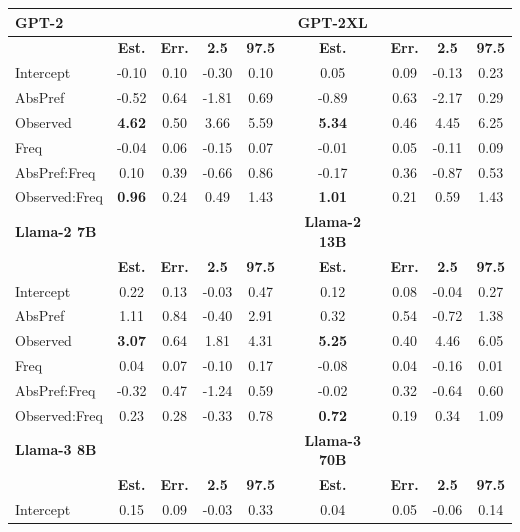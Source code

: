 \documentclass[
  12pt,
  letterpaper,
]{scrreport}
\begin{document}
\begin{table}
{    \centering
    \begin{tabular}{l|cccc|cccc}
    \hline 
        \textbf{GPT-2} & & & & & \textbf{GPT-2XL} \\
        \hline
         & \textbf{Est.} & \textbf{Err.} & \textbf{2.5} & \textbf{97.5} & \textbf{Est.} & \textbf{Err.} & \textbf{2.5} & \textbf{97.5} \\
         \hline
         Intercept & -0.10 & 0.10 & -0.30 & 0.10 & 0.05 & 0.09 & -0.13 & 0.23\\
         AbsPref & -0.52 & 0.64 & -1.81 & 0.69 & -0.89 & 0.63 & -2.17 & 0.29 \\
         Observed & \textbf{4.62} & 0.50 & 3.66 & 5.59 & \textbf{5.34} & 0.46 & 4.45 & 6.25 \\
         Freq & -0.04 & 0.06 & -0.15 & 0.07 & -0.01 & 0.05 & -0.11 & 0.09 \\
         AbsPref:Freq & 0.10 & 0.39 & -0.66 & 0.86 & -0.17 & 0.36 & -0.87 & 0.53 \\
         Observed:Freq & \textbf{0.96} & 0.24 & 0.49 & 1.43 & \textbf{1.01} & 0.21 & 0.59 & 1.43 \\
         \hline
         \textbf{Llama-2 7B} & & & & & \textbf{Llama-2 13B} \\
        \hline
         & \textbf{Est.} & \textbf{Err.} & \textbf{2.5} & \textbf{97.5} & \textbf{Est.} & \textbf{Err.} & \textbf{2.5} & \textbf{97.5} \\
         \hline
         Intercept & 0.22 & 0.13 & -0.03 & 0.47 & 0.12 & 0.08 & -0.04 & 0.27 \\
         AbsPref & 1.11 & 0.84 & -0.40 & 2.91 &  0.32 & 0.54 & -0.72 & 1.38  \\
         Observed & \textbf{3.07} & 0.64 & 1.81 & 4.31 & \textbf{5.25} & 0.40 & 4.46 & 6.05\\
         Freq & 0.04 & 0.07 & -0.10 & 0.17 & -0.08 & 0.04 & -0.16 & 0.01 \\
         AbsPref:Freq & -0.32 & 0.47 & -1.24 & 0.59 & -0.02 & 0.32 & -0.64 & 0.60 \\
         Observed:Freq & 0.23 & 0.28 & -0.33 & 0.78 & \textbf{0.72} & 0.19 & 0.34 & 1.09  \\
         \hline
         \textbf{Llama-3 8B} & & & & & \textbf{Llama-3 70B}\\
        \hline
         & \textbf{Est.} & \textbf{Err.} & \textbf{2.5} & \textbf{97.5} & \textbf{Est.} & \textbf{Err.} & \textbf{2.5} & \textbf{97.5} \\
         \hline
         Intercept & 0.15 & 0.09 & -0.03 & 0.33 & 0.04 & 0.05 & -0.06 & 0.14 \\

\end{tabular}}
\end{table}
\end{document}
